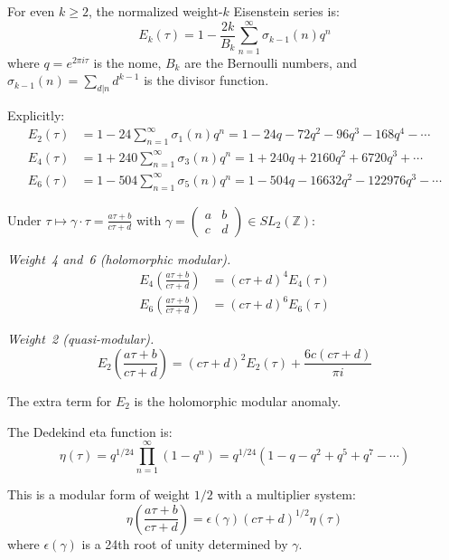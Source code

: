 \begin{definition}\label{def:eisenstein-series}
For even $k \geq 2$, the normalized weight-$k$ Eisenstein series is:
\begin{equation}
E_k(\tau) = 1 - \frac{2k}{B_k} \sum_{n=1}^{\infty} \sigma_{k-1}(n) q^n
\end{equation}
where $q = e^{2\pi i \tau}$ is the nome, $B_k$ are the Bernoulli numbers, and $\sigma_{k-1}(n) = \sum_{d|n} d^{k-1}$ is the divisor function.

Explicitly:
\begin{align}
E_2(\tau) &= 1 - 24\sum_{n=1}^{\infty} \sigma_1(n) q^n
= 1 - 24q - 72q^2 - 96q^3 - 168q^4 - \cdots \label{eq:E2-expansion} \\
E_4(\tau) &= 1 + 240\sum_{n=1}^{\infty} \sigma_3(n) q^n
= 1 + 240q + 2160q^2 + 6720q^3 + \cdots \label{eq:E4-expansion} \\
E_6(\tau) &= 1 - 504\sum_{n=1}^{\infty} \sigma_5(n) q^n
= 1 - 504q - 16632q^2 - 122976q^3 - \cdots \label{eq:E6-expansion}
\end{align}
\end{definition}

\begin{proposition}\label{prop:eisenstein-modular}
Under $\tau \mapsto \gamma \cdot \tau = \frac{a\tau + b}{c\tau + d}$ with
$\gamma = \begin{pmatrix} a & b \\ c & d \end{pmatrix} \in SL_2(\mathbb{Z})$:

\emph{Weight~4 and~6 (holomorphic modular).}
\begin{align}
E_4\left(\frac{a\tau+b}{c\tau+d}\right) &= (c\tau + d)^4 E_4(\tau) \\
E_6\left(\frac{a\tau+b}{c\tau+d}\right) &= (c\tau + d)^6 E_6(\tau)
\end{align}

\emph{Weight~2 (quasi-modular).}
\begin{equation}
E_2\left(\frac{a\tau+b}{c\tau+d}\right) = (c\tau + d)^2 E_2(\tau)
+ \frac{6c(c\tau + d)}{\pi i}
\end{equation}

The extra term for $E_2$ is the holomorphic modular anomaly.
\end{proposition}

\begin{definition}\label{def:eta-function}
The Dedekind eta function is:
\begin{equation}
\eta(\tau) = q^{1/24} \prod_{n=1}^{\infty} (1 - q^n)
= q^{1/24}(1 - q - q^2 + q^5 + q^7 - \cdots)
\end{equation}

This is a modular form of weight $1/2$ with a multiplier system:
\begin{equation}
\eta\left(\frac{a\tau+b}{c\tau+d}\right) = \epsilon(\gamma) (c\tau + d)^{1/2} \eta(\tau)
\end{equation}
where $\epsilon(\gamma)$ is a 24th root of unity determined by $\gamma$.
\end{definition}

